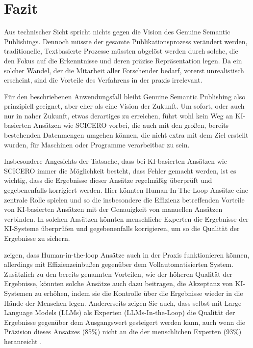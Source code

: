 \section{Fazit}
\label{sec:fazit}

Aus technischer Sicht spricht nichts gegen die Vision des Genuine Semantic Publishings.
Dennoch müsste der gesamte Publikationsprozess verändert werden, traditionelle, Textbasierte Prozesse müssten abgelöst werden durch solche, die den Fokus auf die Erkenntnisse und deren präzise Repräsentation legen.
Da ein solcher Wandel, der die Mitarbeit aller Forschender bedarf, vorerst unrealistisch erscheint, sind die Vorteile des Verfahrens in der praxis irrelevant.

Für den beschriebenen Anwendungsfall bleibt Genuine Semantic Publishing also prinzipiell geeignet, aber eher als eine Vision der Zukunft.
Um sofort, oder auch nur in naher Zukunft, etwas derartiges zu erreichen, führt wohl kein Weg an KI-basierten Ansätzen wie SCICERO vorbei, die auch mit den großen, bereits bestehenden Datenmengen umgehen können, die nicht extra mit dem Ziel erstellt wurden, für Maschinen oder Programme verarbeitbar zu sein.

Insbesondere Angesichts der Tatsache, dass bei KI-basierten Ansätzen wie SCICERO immer die Möglichkeit besteht, dass Fehler gemacht werden, ist es wichtig, dass die Ergebnisse dieser Ansätze regelmäßig überprüft und gegebenenfalls korrigiert werden.
Hier könnten Human-In-The-Loop Ansätze eine zentrale Rolle spielen und so die \textemdash insbesondere die Effizienz betreffenden \textemdash Vorteile von KI-basierten Ansätzen mit der Genauigkeit von manuellen Ansätzen verbinden.
In solchen Ansätzen könnten menschliche Experten die Ergebnisse der KI-Systeme überprüfen und gegebenenfalls korrigieren, um so die Qualität der Ergebnisse zu sichern.

\citet{Tsaneva2024EnhancingSK} zeigen, dass Human-in-the-loop Ansätze auch in der Praxis funktionieren können, allerdings mit Effizienzeinbußen gegenüber dem Vollautomatisierten System.
Zusätzlich zu den bereits genannten Vorteilen, wie der höheren Qualität der Ergebnisse, könnten solche Ansätze auch dazu beitragen, die Akzeptanz von KI-Systemen zu erhöhen, indem sie die Kontrolle über die Ergebnisse wieder in die Hände der Menschen legen.
Andererseits zeigen Sie auch, dass selbst mit Large Language Models (LLMs) als Experten (LLMs-In-the-Loop) die Qualität der Ergebnisse gegenüber dem Ausgangswert gesteigert werden kann, auch wenn die Präzision dieses Ansatzes (85\%) nicht an die der menschlichen Experten (93\%) heranreicht \cite{Tsaneva2024EnhancingSK}.
